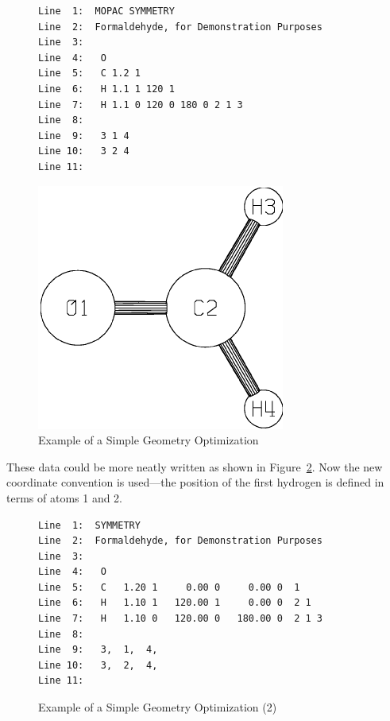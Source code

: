 \begin{figure}
\begin{makeimage}
\end{makeimage}
\begin{verbatim}
Line  1:  MOPAC SYMMETRY
Line  2:  Formaldehyde, for Demonstration Purposes
Line  3:
Line  4:   O
Line  5:   C 1.2 1
Line  6:   H 1.1 1 120 1
Line  7:   H 1.1 0 120 0 180 0 2 1 3 
Line  8:
Line  9:   3 1 4
Line 10:   3 2 4
Line 11:
\end{verbatim}
\begin{center}
\includegraphics{picch2o}
\end{center}
\caption{\label{ch2o1}Example of a Simple Geometry Optimization}
\end{figure}

These data could be more neatly written as shown in Figure~\ref{ch2o2}.
Now the new coordinate convention is used---the position of the first 
hydrogen is defined in terms of atoms 1 and 2.
\begin{figure}
\begin{makeimage}
\end{makeimage}
\begin{verbatim}
Line  1:  SYMMETRY
Line  2:  Formaldehyde, for Demonstration Purposes
Line  3:
Line  4:   O
Line  5:   C   1.20 1     0.00 0     0.00 0  1
Line  6:   H   1.10 1   120.00 1     0.00 0  2 1
Line  7:   H   1.10 0   120.00 0   180.00 0  2 1 3
Line  8:
Line  9:   3,  1,  4,
Line 10:   3,  2,  4,
Line 11:
\end{verbatim}
\caption{\label{ch2o2} Example of a Simple Geometry Optimization (2)}
\end{figure}
      
